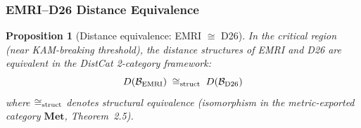 \documentclass[
]{article}
\newtheorem{proposition}[theorem]{Proposition}
\begin{document}
\subsubsection{EMRI--D26 Distance Equivalence}\label{subsec:emri-d26-eq}

\begin{proposition}[Distance equivalence: EMRI $\cong$ D26]\label{prop:emri-d26-dist-eq}
In the critical region (near KAM-breaking threshold), the distance structures of EMRI and D26 are equivalent in the DistCat 2-category framework:
\begin{equation}
D(\mathcal{B}_{\rm EMRI}) \;\cong_{\rm struct}\; D(\mathcal{B}_{\rm D26})
\end{equation}
where $\cong_{\rm struct}$ denotes structural equivalence (isomorphism in the metric-exported category $\mathbf{Met}$, Theorem~2.5).
\end{proposition}
\end{document}

